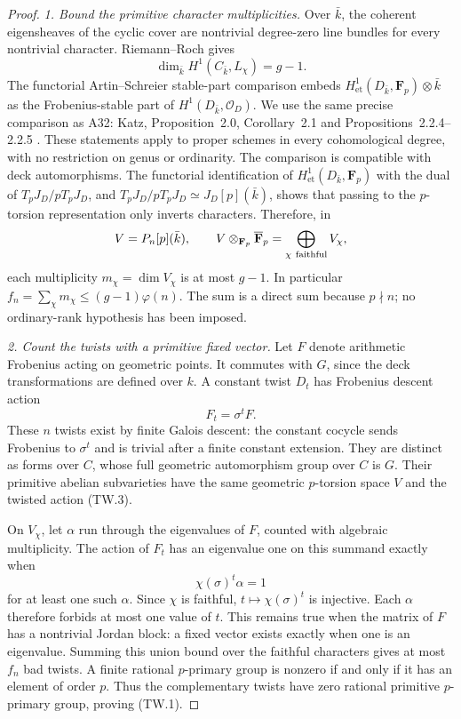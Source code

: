 \begin{proof}
\emph{1. Bound the primitive character multiplicities.}
Over $\bar k$, the coherent eigensheaves of the cyclic cover are
nontrivial degree-zero line bundles for every nontrivial
character. Riemann--Roch gives
\[
             \dim_{\bar k}H^1(C_{\bar k},L_\chi)=g-1.
 \tag{TW.2}
\]
The functorial Artin--Schreier stable-part comparison embeds
$H^1_{\mathrm{et}}(D_{\bar k},\mathbf F_p)\otimes\bar k$
as the Frobenius-stable part of $H^1(D_{\bar k},\mathcal O_D)$.
We use the same precise comparison as A32: Katz,
Proposition~2.0, Corollary~2.1 and Propositions~2.2.4--2.2.5
\cite{KatzCongruence}. These statements apply to proper schemes
in every cohomological degree, with no restriction on genus or
ordinarity. The comparison is compatible with deck automorphisms.
The functorial identification of $H^1_{\mathrm{et}}(D_{\bar k},
\mathbf F_p)$ with the dual of $T_pJ_D/pT_pJ_D$, and
$T_pJ_D/pT_pJ_D\simeq J_D[p](\bar k)$, shows that passing to
the $p$-torsion representation only inverts characters. Therefore,
in
\[
 V=P_n[p](\bar k),\qquad
 V\otimes_{\mathbf F_p}\overline{\mathbf F}_p
                    =\bigoplus_{\chi\ {\rm faithful}}V_\chi,
\]
each multiplicity $m_\chi=\dim V_\chi$ is at most $g-1$.
In particular $f_n=\sum_\chi m_\chi\le(g-1)\varphi(n)$.
The sum is a direct sum because $p\nmid n$; no ordinary-rank
hypothesis has been imposed.

\emph{2. Count the twists with a primitive fixed vector.}
Let $F$ denote arithmetic Frobenius acting on geometric points.
It commutes with $G$, since the deck transformations are defined
over $k$. A constant twist $D_t$ has Frobenius descent action
\[
                           F_t=\sigma^t F.
 \tag{TW.3}
\]
These $n$ twists exist by finite Galois descent: the constant
cocycle sends Frobenius to $\sigma^t$ and is trivial after a
finite constant extension. They are distinct as forms over $C$,
whose full geometric automorphism group over $C$ is $G$.
Their primitive abelian subvarieties have the same geometric
$p$-torsion space $V$ and the twisted action (TW.3).

On $V_\chi$, let $\alpha$ run through the eigenvalues of $F$,
counted with algebraic multiplicity. The action of $F_t$ has
an eigenvalue one on this summand exactly when
\[
                         \chi(\sigma)^t\alpha=1
 \tag{TW.4}
\]
for at least one such $\alpha$. Since $\chi$ is faithful,
$t\mapsto\chi(\sigma)^t$ is injective. Each $\alpha$ therefore
forbids at most one value of $t$. This remains true when the
matrix of $F$ has a nontrivial Jordan block: a fixed vector
exists exactly when one is an eigenvalue. Summing this union
bound over the faithful characters gives at most $f_n$ bad
twists. A finite rational $p$-primary group is nonzero if and
only if it has an element of order $p$. Thus the complementary
twists have zero rational primitive $p$-primary group, proving
(TW.1).


\end{proof}
